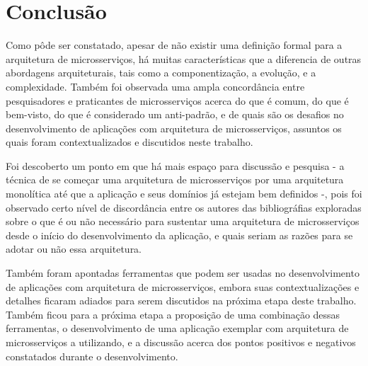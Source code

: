\chapter{Conclusão}\label{chapter-conclusao}

Como pôde ser constatado, apesar de não existir uma definição formal para a arquitetura de microsserviços, há muitas características que a diferencia de outras abordagens arquiteturais, tais como a componentização, a evolução, e a complexidade. Também foi observada uma ampla concordância entre pesquisadores e praticantes de microsserviços acerca do que é comum, do que é bem-visto, do que é considerado um anti-padrão, e de quais são os desafios no desenvolvimento de aplicações com arquitetura de microsserviços, assuntos os quais foram contextualizados e discutidos neste trabalho. 

Foi descoberto um ponto em que há mais espaço para discussão e pesquisa - a técnica de se começar uma arquitetura de microsserviços por uma arquitetura monolítica até que a aplicação e seus domínios já estejam bem definidos -, pois foi observado certo nível de discordância entre os autores das bibliográfias exploradas sobre o que é ou não necessário para sustentar uma arquitetura de microsserviços desde o início do desenvolvimento da aplicação, e quais seriam as razões para se adotar ou não essa arquitetura.

Também foram apontadas ferramentas que podem ser usadas no desenvolvimento de aplicações com arquitetura de microsserviços, embora suas contextualizações e detalhes ficaram adiados para serem discutidos na próxima etapa deste trabalho. Também ficou para a próxima etapa a proposição de uma combinação dessas ferramentas, o desenvolvimento de uma aplicação exemplar com arquitetura de microsserviços a utilizando, e a discussão acerca dos pontos positivos e negativos constatados durante o desenvolvimento.


